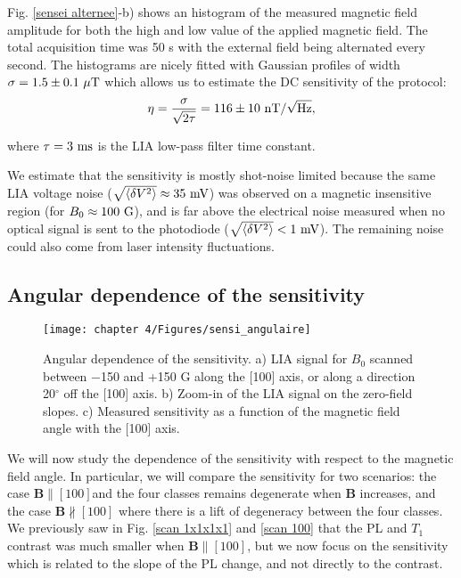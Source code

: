 \documentclass[a4paper, 11pt]{book}
\begin{document}
Fig. \ref{sensei alternee}-b) shows an histogram of the measured magnetic field amplitude for both the high and low value of the applied magnetic field. The total acquisition time was 50 s with the external field being alternated every second. The histograms are nicely fitted with Gaussian profiles of width $\sigma=1.5\pm 0.1\ \rm{\mu T}$ which allows us to estimate the DC sensitivity of the protocol:
\begin{equation}
\eta = \frac{\sigma}{\sqrt{2 \tau}}= 116 \pm 10\ \rm{nT} / \sqrt{\rm Hz},
\end{equation}

where $\tau=3\ \rm ms$ is the LIA low-pass filter time constant. 

We estimate that the sensitivity is mostly shot-noise limited because the same LIA voltage noise ($\sqrt{\langle \delta V^2 \rangle} \approx 35\ \rm mV$) was observed on a magnetic insensitive region (for $B_0 \approx 100\ \rm G$), and is far above the electrical noise measured when no optical signal is sent to the photodiode ($\sqrt{\langle \delta V^2 \rangle} < 1\ \rm mV$). The remaining noise could also come from laser intensity fluctuations.

\subsection{Angular dependence of the sensitivity}
\label{sec angular sensi}
\begin{figure}[h!]
\centering
\texttt{[image: chapter 4/Figures/sensi\_angulaire]}
\caption{Angular dependence of the sensitivity. a) LIA signal for $B_0$ scanned between $-$150 and +150 G along the [100] axis, or along a direction 20$^\circ$ off the [100] axis. b) Zoom-in of the LIA signal on the zero-field slopes. c) Measured sensitivity as a function of the magnetic field angle with the [100] axis.}
\label{angular sensi}
\end{figure}

We will now study the dependence of the sensitivity with respect to the magnetic field angle. In particular, we will compare the sensitivity for two scenarios: the case $\mathbf{B}\parallel [100]$and the four classes remains degenerate when $\mathbf{B}$ increases, and the case $\mathbf{B}\nparallel [100]$ where there is a lift of degeneracy between the four classes. We previously saw in Fig. \ref{scan 1x1x1x1} and \ref{scan 100} that the PL and $T_1$ contrast was much smaller when $\mathbf{B}\parallel [100]$, but we now focus on the sensitivity which is related to the slope of the PL change, and not directly to the contrast.
\end{document}
